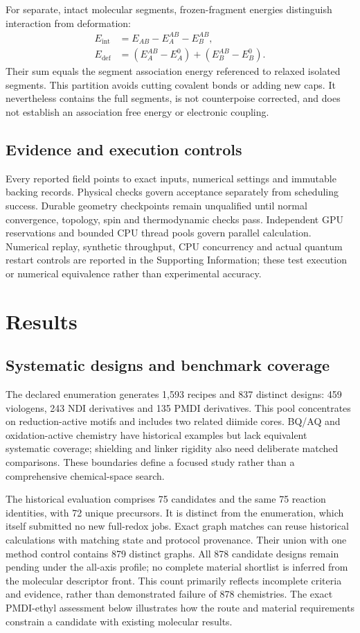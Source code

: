\documentclass[11pt]{article}
\begin{document}
For separate, intact molecular segments, frozen-fragment energies distinguish interaction from deformation:
\begin{align}
E_{\mathrm{int}} &= E_{AB}-E_A^{AB}-E_B^{AB},\\
E_{\mathrm{def}} &= (E_A^{AB}-E_A^0)+(E_B^{AB}-E_B^0).
\end{align}
Their sum equals the segment association energy referenced to relaxed isolated segments. This partition avoids cutting covalent bonds or adding new caps. It nevertheless contains the full segments, is not counterpoise corrected, and does not establish an association free energy or electronic coupling.

\subsection{Evidence and execution controls}
Every reported field points to exact inputs, numerical settings and immutable backing records. Physical checks govern acceptance separately from scheduling success. Durable geometry checkpoints remain unqualified until normal convergence, topology, spin and thermodynamic checks pass. Independent GPU reservations and bounded CPU thread pools govern parallel calculation. Numerical replay, synthetic throughput, CPU concurrency and actual quantum restart controls are reported in the Supporting Information; these test execution or numerical equivalence rather than experimental accuracy.

\section{Results}
\subsection{Systematic designs and benchmark coverage}
The declared enumeration generates 1,593 recipes and 837 distinct designs: 459 viologens, 243 NDI derivatives and 135 PMDI derivatives. This pool concentrates on reduction-active motifs and includes two related diimide cores. BQ/AQ and oxidation-active chemistry have historical examples but lack equivalent systematic coverage; shielding and linker rigidity also need deliberate matched comparisons. These boundaries define a focused study rather than a comprehensive chemical-space search.

The historical evaluation comprises 75 candidates and the same 75 reaction identities, with 72 unique precursors. It is distinct from the enumeration, which itself submitted no new full-redox jobs. Exact graph matches can reuse historical calculations with matching state and protocol provenance. Their union with one method control contains 879 distinct graphs. All 878 candidate designs remain pending under the all-axis profile; no complete material shortlist is inferred from the molecular descriptor front. This count primarily reflects incomplete criteria and evidence, rather than demonstrated failure of 878 chemistries. The exact PMDI-ethyl assessment below illustrates how the route and material requirements constrain a candidate with existing molecular results.
\end{document}

